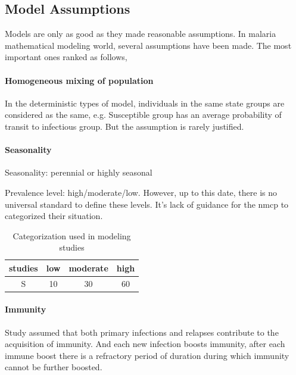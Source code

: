 \documentclass[a4paper, 12pt, twoside]{article}
\begin{document}
\subsection{Model Assumptions}
Models are only as good as they made reasonable assumptions. In malaria mathematical modeling world, several assumptions have been made. The most important ones ranked as follows,

\paragraph{Homogeneous mixing of population}%
\label{par:homogeneous_mixing_of_population}
In the deterministic types of model, individuals in the same state groups are considered as the same, e.g. Susceptible group has an average probability of transit to infectious group. But the assumption is rarely justified.

\paragraph{Seasonality}%
\label{par:seasonality}
Seasonality: perennial or highly seasonal

Prevalence level: high/moderate/low.
However, up to this date, there is no universal standard to define these levels.
It's lack of guidance for the \gls{nmcp} to categorized their situation.

\begin{table}
	\centering
	\begin{tabular}{c S S S}
		\toprule
		studies & {low} & {moderate} & {high} \\
		\midrule
		S       & 10    & 30         & 60     \\
		\bottomrule
	\end{tabular}
	\caption{Categorization used in modeling studies}
\end{table}

\paragraph{Immunity}%
\label{par:immunity}
Study\cite{White2018b} assumed that both primary infections and relapses contribute to the acquisition of immunity.
And each new infection boosts immunity, after each immune boost there is a refractory period of duration during which immunity cannot be further boosted.
\end{document}
